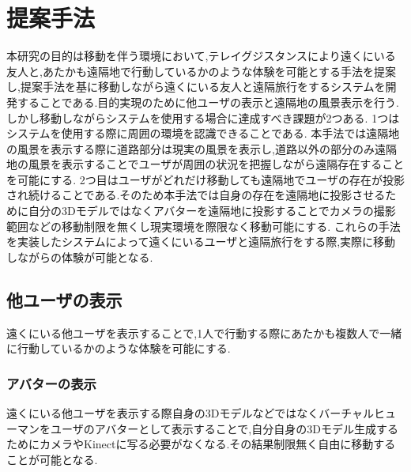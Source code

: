 \section{提案手法}
本研究の目的は移動を伴う環境において,テレイグジスタンスにより遠くにいる友人と,あたかも遠隔地で行動しているかのような体験を可能とする手法を提案し,提案手法を基に移動しながら遠くにいる友人と遠隔旅行をするシステムを開発することである.目的実現のために他ユーザの表示と遠隔地の風景表示を行う.
しかし移動しながらシステムを使用する場合に達成すべき課題が2つある.
1つはシステムを使用する際に周囲の環境を認識できることである.
本手法では遠隔地の風景を表示する際に道路部分は現実の風景を表示し,道路以外の部分のみ遠隔地の風景を表示することでユーザが周囲の状況を把握しながら遠隔存在することを可能にする.
2つ目はユーザがどれだけ移動しても遠隔地でユーザの存在が投影され続けることである.そのため本手法では自身の存在を遠隔地に投影させるために自分の3Dモデルではなくアバターを遠隔地に投影することでカメラの撮影範囲などの移動制限を無くし現実環境を際限なく移動可能にする.
これらの手法を実装したシステムによって遠くにいるユーザと遠隔旅行をする際,実際に移動しながらの体験が可能となる.

\clearpage

\subsection{他ユーザの表示}
遠くにいる他ユーザを表示することで,1人で行動する際にあたかも複数人で一緒に行動しているかのような体験を可能にする.

\subsubsection{アバターの表示}
遠くにいる他ユーザを表示する際自身の3Dモデルなどではなくバーチャルヒューマンをユーザのアバターとして表示することで,自分自身の3Dモデル生成するためにカメラやKinect\cite{kinect}に写る必要がなくなる.その結果制限無く自由に移動することが可能となる.%

